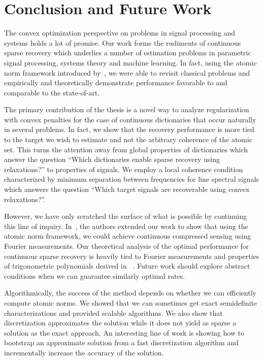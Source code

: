 \chapter{Conclusion and Future Work} %
\label{chap:conclusion}

The convex optimization perspective on problems in signal processing and systems
holds a lot of promise. Our work forms the rudiments of continuous sparse
recovery which underlies a number of estimation problems in parametric signal
processing, systems theory and machine learning. In fact, using the atomic norm
framework introduced by~\cite{crpw}, we were able to revisit classical problems
and empirically and theoretically demonstrate performance favorable to and
comparable to the state-of-art.

The primary contribution of the thesis is a novel way to analyze regularization
with convex penalties for the case of continuous dictionaries that occur
naturally in several problems. In fact, we show that the recovery performance is
more tied to the target we wish to estimate and not the arbitrary coherence of
the atomic set. This turns the attention away from global properties of
dictionaries which answer the question ``Which dictionaries enable sparse
recovery using relaxations?'' to properties of signals. We employ a local
coherence condition characterized by minimum separation between frequencies for
line spectral signals which answers the question ``Which target signals are
recoverable using convex relaxations?''.

However, we have only scratched the surface of what is possible by continuing
this line of inquiry. In~\cite{cs_otg}, the authors extended our work to show
that using the atomic norm framework, we could achieve continuous compressed
sensing using Fourier measurements. Our theoretical analysis of the optimal
performance for continuous sparse recovery is heavily tied to Fourier
measurements and properties of trigonometric polynomials derived in
~\cite{CandesGranda,cg_noisy}. Future work should explore abstract conditions
when we can guarantee similarly optimal rates.

Algorithmically, the success of the method depends on whether we can efficiently
compute atomic norms. We showed that we can sometimes get exact semidefinite
characterizations and provided scalable algorithms. We also show that
discretization approximates the solution while it does not yield as sparse a
solution as the exact approach. An interesting line of work is showing how to
bootstrap an approximate solution from a fast discretization algorithm and
incrementally increase the accuracy of the solution. 

